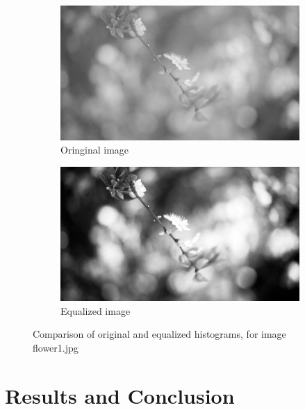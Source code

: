 \documentclass[10pt]{article}
\begin{document}
\begin{figure}[ht]
  \centering
  \begin{subfigure}[c]{0.4\textwidth}
    \includegraphics[width=\textwidth]{images/flower1-neq.jpg}
    \caption{Oringinal image}
    \label{fig:original-histogram}
  \end{subfigure}
  \begin{subfigure}[d]{0.4\textwidth}
    \includegraphics[width=\textwidth]{images/flower1-neq_out.jpg}
    \caption{Equalized image}
    \label{fig:equalized-histogram}
  \end{subfigure}
  \caption{Comparison of original and equalized histograms, for image flower1.jpg}
\end{figure}

\pagebreak

\section{Results and Conclusion}
\label{sec:Introduction}
\end{document}
